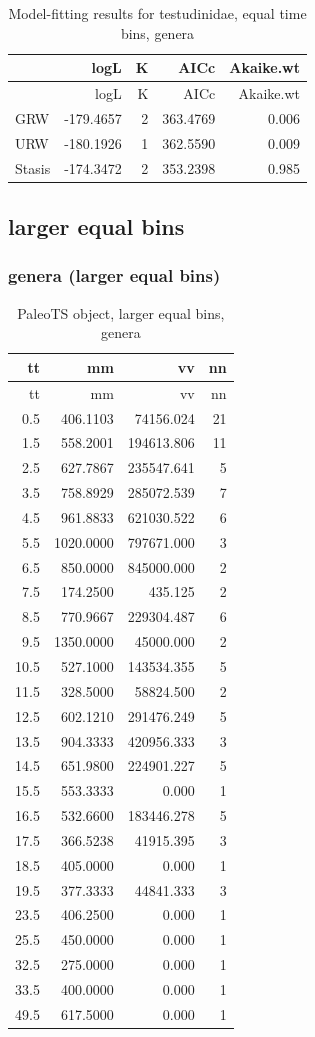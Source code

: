 \documentclass[]{article}
\begin{document}
\begin{longtable}[]{@{}lrrrr@{}}
\caption{Model-fitting results for testudinidae, equal time bins,
genera}\tabularnewline
\toprule
& logL & K & AICc & Akaike.wt\tabularnewline
\midrule
\endfirsthead
\toprule
& logL & K & AICc & Akaike.wt\tabularnewline
\midrule
\endhead
GRW & -179.4657 & 2 & 363.4769 & 0.006\tabularnewline
URW & -180.1926 & 1 & 362.5590 & 0.009\tabularnewline
Stasis & -174.3472 & 2 & 353.2398 & 0.985\tabularnewline
\bottomrule
\end{longtable}

\newpage

\subsection{larger equal bins}\label{larger-equal-bins}

\subsubsection{genera (larger equal
bins)}\label{genera-larger-equal-bins}

\begin{longtable}[]{@{}rrrr@{}}
\caption{PaleoTS object, larger equal bins, genera}\tabularnewline
\toprule
tt & mm & vv & nn\tabularnewline
\midrule
\endfirsthead
\toprule
tt & mm & vv & nn\tabularnewline
\midrule
\endhead
0.5 & 406.1103 & 74156.024 & 21\tabularnewline
1.5 & 558.2001 & 194613.806 & 11\tabularnewline
2.5 & 627.7867 & 235547.641 & 5\tabularnewline
3.5 & 758.8929 & 285072.539 & 7\tabularnewline
4.5 & 961.8833 & 621030.522 & 6\tabularnewline
5.5 & 1020.0000 & 797671.000 & 3\tabularnewline
6.5 & 850.0000 & 845000.000 & 2\tabularnewline
7.5 & 174.2500 & 435.125 & 2\tabularnewline
8.5 & 770.9667 & 229304.487 & 6\tabularnewline
9.5 & 1350.0000 & 45000.000 & 2\tabularnewline
10.5 & 527.1000 & 143534.355 & 5\tabularnewline
11.5 & 328.5000 & 58824.500 & 2\tabularnewline
12.5 & 602.1210 & 291476.249 & 5\tabularnewline
13.5 & 904.3333 & 420956.333 & 3\tabularnewline
14.5 & 651.9800 & 224901.227 & 5\tabularnewline
15.5 & 553.3333 & 0.000 & 1\tabularnewline
16.5 & 532.6600 & 183446.278 & 5\tabularnewline
17.5 & 366.5238 & 41915.395 & 3\tabularnewline
18.5 & 405.0000 & 0.000 & 1\tabularnewline
19.5 & 377.3333 & 44841.333 & 3\tabularnewline
23.5 & 406.2500 & 0.000 & 1\tabularnewline
25.5 & 450.0000 & 0.000 & 1\tabularnewline
32.5 & 275.0000 & 0.000 & 1\tabularnewline
33.5 & 400.0000 & 0.000 & 1\tabularnewline
49.5 & 617.5000 & 0.000 & 1\tabularnewline
\bottomrule
\end{longtable}
\end{document}
